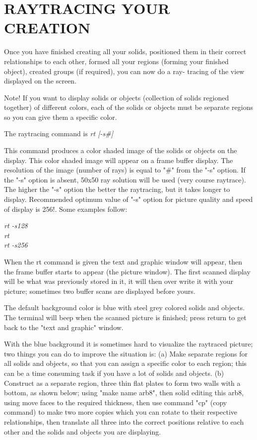 \chapter{RAYTRACING YOUR CREATION}

Once you have finished creating all your solids, positioned them in
their correct relationships to each other, formed all your regions (forming
your finished object), created groups (if required), you can now do a ray-
tracing of the view displayed on the screen.

Note!  If you want to display solids or objects (collection of solids
regioned together) of different colors, each of the solids or objects must be
separate regions so you can give them a specific color.

The raytracing command is
{\em\center
  rt [-s\#]
}

This command produces a color shaded image of the solids or objects on
the display.  This color shaded image  will appear on a frame buffer display.
The resolution of the image (number of rays) is equal to "\#" from the "-s"
option.  If the "-s" option is absent, 50x50 ray solution will be used (very
course raytrace).  The higher the "-s" option the better the raytracing, but
it takes longer to display.
Recommended optimum value of "-s" option for picture
quality and speed of display is 256!.  Some examples follow:

{\em
             rt -s128 \\
             rt \\
             rt -s256 \\
}

When the rt command is given the text and graphic window will appear,
then the frame buffer starts to appear (the picture window).  The first scanned
display will be what was previously stored in it, it will then over write it
with your picture; sometimes two buffer scans are displayed before yours.

The default background color is blue with steel grey colored solids and
objects.  The terminal will beep when the scanned picture is finished; press
return to get back to the "text and graphic" window.

With the blue background it is sometimes hard to visualize the raytraced
picture; two things you can do to improve the situation is:
     (a)  Make separate regions for all solids and objects, so that you can
assign a specific color to each region; this can be a time consuming task if
you have a lot of solids and objects.
     (b)  Construct as a separate region, three thin flat plates to form two
walls with a bottom, as shown below; using "make name arb8",
then solid editing this arb8, using move faces to the required thickness,
then use command "cp"
(copy command) to make two more copies which you can rotate to their
respective relationships, then translate all three into the correct positions
relative to each other and the solids and objects you are displaying.


